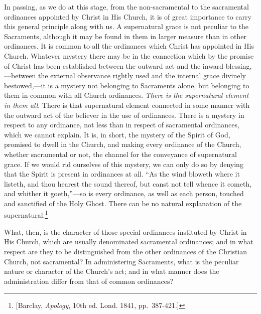 \documentclass[]{book}
\begin{document}
In passing, as we do at this stage, from the non-sacramental to the sacramental ordinances appointed by Christ in His Church, it is of great importance to carry this general principle along with us. A supernatural grace is not peculiar to the Sacraments, although it may be found in them in larger measure than in other ordinances. It is common to all the ordinances which Christ has appointed in His Church. Whatever mystery there may be in the connection which by the promise of Christ has been established between the outward act and the inward blessing,---between the external observance rightly used and the internal grace divinely bestowed,---it is a mystery not belonging to Sacraments alone, but belonging to them in common with all Church ordinances. \emph{There is the supernatural element in them all}. There is that supernatural element connected in some manner with the outward act of the believer in the use of ordinances. There is a mystery in respect to any ordinance, not less than in respect of sacramental ordinances, which we cannot explain. It is, in short, the mystery of the Spirit of God, promised to dwell in the Church, and making every ordinance of the Church, whether sacramental or not, the channel for the conveyance of supernatural grace. If we would rid ourselves of this mystery, we can only do so by denying that the Spirit is present in ordinances at all. ``As the wind bloweth where it listeth, and thou hearest the sound thereof, but canst not tell whence it cometh, and whither it goeth,''---so is every ordinance, as well as each person, touched and sanctified of the Holy Ghost. There can be no natural explanation of the supernatural.\footnote{{[}Barclay, \emph{Apology}, 10th ed. Lond. 1841, pp.~387-421.{]}}

What, then, is the character of those special ordinances instituted by Christ in His Church, which are usually denominated sacramental ordinances; and in what respect are they to be distinguished from the other ordinances of the Christian Church, not sacramental? In administering Sacraments, what is the peculiar nature or character of the Church's act; and in what manner does the administration differ from that of common ordinances?
\end{document}
